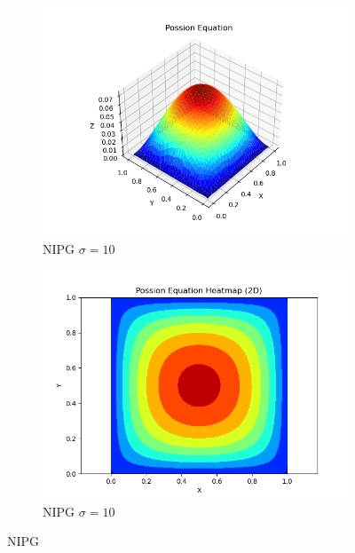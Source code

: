 \begin{figure}[H]
    \begin{subfigure}{0.5\textwidth}  
        \centering  
        \includegraphics[width=0.9\linewidth]{./pics/final/possion/2d/3Dplot_eps1.0sig10.0_parapq30a0.01e.png}  
        \caption{NIPG $\sigma=10$}  
    \end{subfigure}%
    \begin{subfigure}{0.5\textwidth}  
        \centering  
        \includegraphics[width=0.9\linewidth]{./pics/final/possion/2d/heatmap_eps1.0sig10.0_parapq30a0.01e.png}  
        \caption{NIPG $\sigma=10$}
    \end{subfigure}  
    \caption{NIPG}  
\end{figure} 

